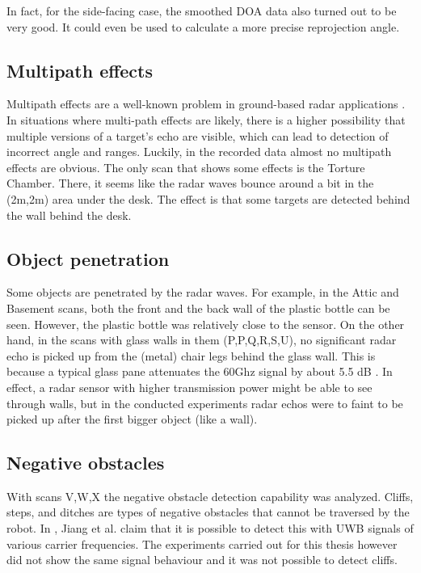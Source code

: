 In fact, for the side-facing case, the smoothed DOA data also turned out
to be very good. It could even be used to calculate a more precise
reprojection angle.

\subsection{Multipath effects}\label{multipath-effects}

Multipath effects are a well-known problem in ground-based radar
applications \cite{Adams2012}. In situations where multi-path effects
are likely, there is a higher possibility that multiple versions of a
target's echo are visible, which can lead to detection of incorrect
angle and ranges. Luckily, in the recorded data almost no multipath
effects are obvious. The only scan that shows some effects is the
Torture Chamber. There, it seems like the radar waves bounce around a
bit in the (2m,2m) area under the desk. The effect is that some targets
are detected behind the wall behind the desk.



\subsection{Object penetration}\label{object-penetration}

Some objects are penetrated by the radar waves. For example, in the
Attic and Basement scans, both the front and the back wall of the
plastic bottle can be seen. However, the plastic bottle was relatively
close to the sensor. On the other hand, in the scans with glass walls in
them (P,P,Q,R,S,U), no significant radar echo is picked up from the
(metal) chair legs behind the glass wall. This is because a typical
glass pane attenuates the 60Ghz signal by about 5.5 dB \cite{Lu2014}. In
effect, a radar sensor with higher transmission power might be able to
see through walls, but in the conducted experiments radar echos were to
faint to be picked up after the first bigger object (like a wall).

\subsection{Negative obstacles}\label{negative-obstacles}

With scans V,W,X the negative obstacle detection capability was
analyzed. Cliffs, steps, and ditches are types of negative obstacles
that cannot be traversed by the robot. In \cite{Jiang2015}, Jiang et al.
claim that it is possible to detect this with UWB signals of various
carrier frequencies. The experiments carried out for this thesis however
did not show the same signal behaviour and it was not possible to detect
cliffs.

